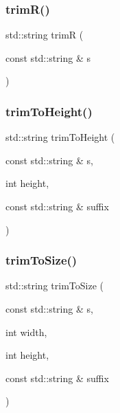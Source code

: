 \subsubsection{\texorpdfstring{trim\+R()}{trimR()}}
{\footnotesize\ttfamily std\+::string trimR (\begin{DoxyParamCaption}\item[{const std\+::string \&}]{s }\end{DoxyParamCaption})}

\mbox{\label{namespacestringutils_a7b8e78be9a57c43689840a89be870ea7}} 
\subsubsection{\texorpdfstring{trim\+To\+Height()}{trimToHeight()}}
{\footnotesize\ttfamily std\+::string trim\+To\+Height (\begin{DoxyParamCaption}\item[{const std\+::string \&}]{s,  }\item[{int}]{height,  }\item[{const std\+::string \&}]{suffix }\end{DoxyParamCaption})}

\mbox{\label{namespacestringutils_a339e8cc8471386ba4314b587f382150d}} 
\subsubsection{\texorpdfstring{trim\+To\+Size()}{trimToSize()}}
{\footnotesize\ttfamily std\+::string trim\+To\+Size (\begin{DoxyParamCaption}\item[{const std\+::string \&}]{s,  }\item[{int}]{width,  }\item[{int}]{height,  }\item[{const std\+::string \&}]{suffix }\end{DoxyParamCaption})}

\mbox{\label{namespacestringutils_a763bfe1246c3b5e99e57aa95c7f5375e}} 
